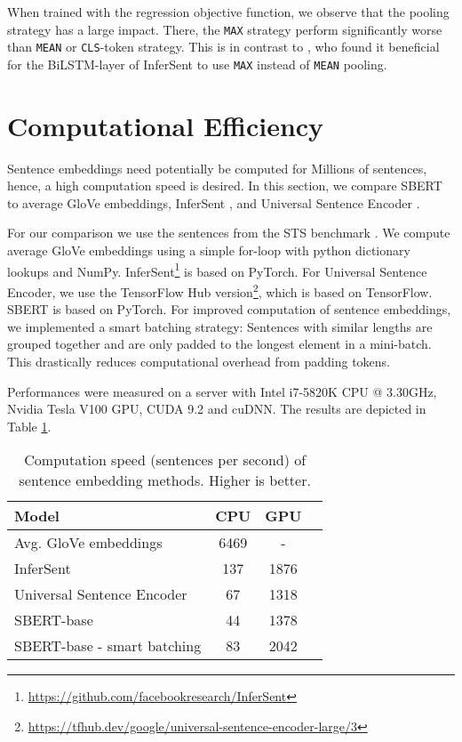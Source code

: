 \documentclass[11pt,a4paper]{article}
\begin{document}
When trained with the regression objective function, we observe that the pooling strategy has a large impact. There, the \texttt{MAX} strategy perform significantly worse than \texttt{MEAN} or \texttt{CLS}-token strategy. This is in contrast to \cite{conneau2017infersent}, who found it beneficial for the BiLSTM-layer of InferSent to use \texttt{MAX} instead of \texttt{MEAN} pooling. 





\section{Computational Efficiency} \label{sec_computational_efficiency}

Sentence embeddings need potentially be computed for Millions of sentences, hence, a high computation speed is desired. In this section, we compare SBERT to average GloVe embeddings, InferSent \cite{conneau2017infersent}, and Universal Sentence Encoder \cite{universal_sentence_encoder}.

For our comparison we use the sentences from the STS benchmark \cite{sts2017}. We compute average GloVe embeddings using a simple for-loop with python dictionary lookups and NumPy. InferSent\footnote{\url{https://github.com/facebookresearch/InferSent}} is based on PyTorch. For Universal Sentence Encoder, we use the TensorFlow Hub version\footnote{\url{https://tfhub.dev/google/universal-sentence-encoder-large/3}}, which is based on TensorFlow. SBERT is based on PyTorch. For improved computation of sentence embeddings, we implemented a smart batching strategy: Sentences with similar lengths are grouped together and are only padded to the longest element in a mini-batch. This drastically reduces computational overhead from padding tokens.   

Performances were measured on a server with Intel i7-5820K CPU @ 3.30GHz, Nvidia Tesla V100 GPU, CUDA 9.2 and cuDNN. The results are depicted in Table \ref{table_computational_efficiency}.


\begin{table}[h]
	\centering 
	\footnotesize
	\begin{tabular}{|l|c|c|c|}
		\hline
		\textbf{Model} & \textbf{CPU} & \textbf{GPU}  \\ \hline
		Avg. GloVe embeddings & 6469 & - \\
		InferSent & 137 & 1876 \\ 
		Universal Sentence Encoder & 67 &  1318 \\
		SBERT-base & 44 & 1378 \\
		SBERT-base - smart batching & 83 & 2042 \\
		\hline			
	\end{tabular}
	\caption{Computation speed (sentences per second) of sentence embedding methods. Higher is better.}
	\label{table_computational_efficiency}
\end{table}
\end{document}
